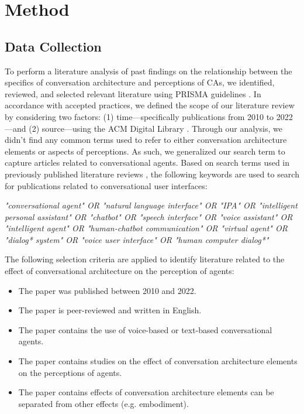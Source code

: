 
\section{Method}


\subsection{Data Collection}
To perform a literature analysis of past findings on the relationship between the specifics of conversation architecture and perceptions of CAs, we identified, reviewed, and selected relevant literature using PRISMA guidelines \cite{prisma}. %
In accordance with accepted practices, we defined the scope of our literature review by considering two factors: (1) time---specifically publications from 2010 to 2022---and (2) source---using the ACM Digital Library \mbox{\cite{zheng2022ux, stigall2019older, mcconvey2023human}.}
Through our analysis, we didn't find any common terms used to refer to either conversation architecture elements or aspects of perceptions. As such, we generalized our search term to capture articles related to conversational agents. Based on search terms used in previously published literature reviews \cite{clark2019state, rapp2021human}, the following keywords are used to search for publications related to conversational user interfaces:
\newline

\textit{"conversational agent" OR "natural language interface" OR "IPA" OR "intelligent personal assistant" OR "chatbot" OR "speech interface" OR "voice assistant" OR "intelligent agent" OR "human-chatbot communication" OR "virtual agent" OR "dialog* system" OR "voice user interface" OR "human computer dialog*"}
\newline

The following selection criteria are applied to identify literature related to the effect of conversational architecture on the perception of agents:
\begin{itemize}
  \item The paper was published between 2010 and 2022.
  \item The paper is peer-reviewed and written in English.
  \item The paper contains the use of voice-based or text-based conversational agents.
  \item The paper contains studies on the effect of conversation architecture elements on the perceptions of agents.
  \item The paper contains effects of conversation architecture elements can be separated from other effects (e.g. embodiment).

\end{itemize}


